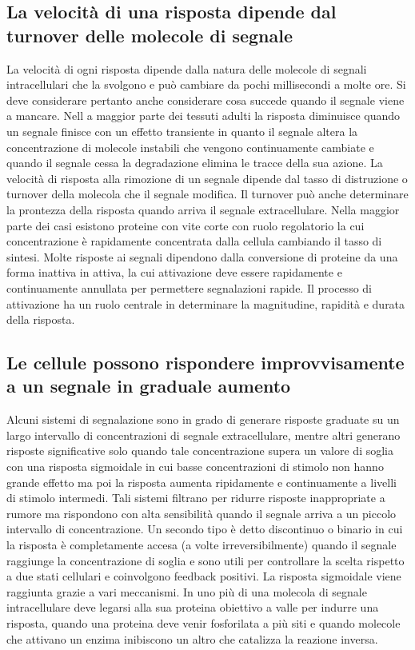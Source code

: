 \subsection{La velocit\`a di una risposta dipende dal turnover delle molecole di segnale}
La velocit\`a di ogni risposta dipende dalla natura delle molecole di segnali intracellulari che la svolgono e pu\`o cambiare da pochi millisecondi a molte ore. Si deve considerare 
pertanto anche considerare cosa succede quando il segnale viene a mancare. Nell a maggior parte dei tessuti adulti la risposta diminuisce quando un segnale finisce con un effetto 
transiente in quanto il segnale altera la concentrazione di molecole instabili che vengono continuamente cambiate e quando il segnale cessa la degradazione elimina le tracce della sua
azione. La velocit\`a di risposta alla rimozione di un segnale dipende dal tasso di distruzione o turnover della molecola che il segnale modifica. Il turnover pu\`o anche determinare
la prontezza della risposta quando arriva il segnale extracellulare. Nella maggior parte dei casi esistono proteine con vite corte con ruolo regolatorio la cui concentrazione \`e 
rapidamente concentrata dalla cellula cambiando il tasso di sintesi. Molte risposte ai segnali dipendono dalla conversione di proteine da una forma inattiva in attiva, la cui attivazione
deve essere rapidamente e continuamente annullata per permettere segnalazioni rapide. Il processo di attivazione ha un ruolo centrale in determinare la magnitudine, rapidit\`a e 
durata della risposta. 
\subsection{Le cellule possono rispondere improvvisamente a un segnale in graduale aumento}
Alcuni sistemi di segnalazione sono in grado di generare risposte graduate su un largo intervallo di concentrazioni di segnale extracellulare, mentre altri generano risposte 
significative solo quando tale concentrazione supera un valore di soglia con una risposta sigmoidale in cui basse concentrazioni di stimolo non hanno grande effetto ma poi la risposta
aumenta ripidamente e continuamente a livelli di stimolo intermedi. Tali sistemi filtrano per ridurre risposte inappropriate a rumore ma rispondono con alta sensibilit\`a quando il 
segnale arriva a un piccolo intervallo di concentrazione. Un secondo tipo \`e detto discontinuo o binario in cui la risposta \`e completamente accesa (a volte irreversibilmente) quando
il segnale raggiunge la concentrazione di soglia e sono utili per controllare la scelta rispetto a due stati cellulari e coinvolgono feedback positivi. La risposta sigmoidale viene
raggiunta grazie a vari meccanismi. In uno pi\`u di una molecola di segnale intracellulare deve legarsi alla sua proteina obiettivo a valle per indurre una risposta, quando una proteina
deve venir fosforilata a pi\`u siti e quando molecole che attivano un enzima inibiscono un altro che catalizza la reazione inversa. 
